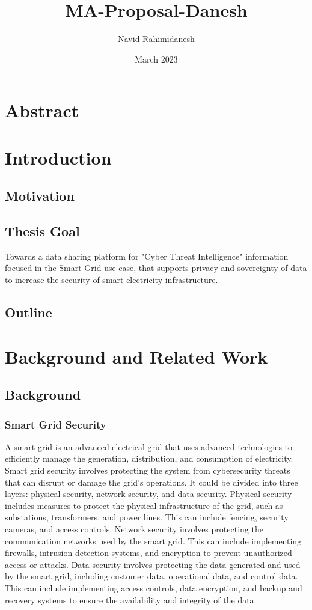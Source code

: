 \documentclass{article}
\title{MA-Proposal-Danesh}
\author{Navid Rahimidanesh}
\date{March 2023}
\begin{document}
\maketitle

\section{Abstract}

\section{Introduction} %

\subsection{Motivation}

\subsection{Thesis Goal}

Towards a data sharing platform for "Cyber Threat Intelligence" information focused in the Smart Grid use case, that supports privacy and sovereignty of data to increase the security of smart electricity infrastructure.

\subsection{Outline}


\section{Background and Related Work} %

\subsection{Background}
\subsubsection*{Smart Grid Security}
A smart grid is an advanced electrical grid that uses advanced technologies to efficiently manage the generation, distribution, and consumption of electricity. Smart grid security involves protecting the system from cybersecurity threats that can disrupt or damage the grid's operations. It could be divided into three layers: physical security, network security, and data security. Physical security includes measures to protect the physical infrastructure of the grid, such as substations, transformers, and power lines. This can include fencing, security cameras, and access controls. Network security involves protecting the communication networks used by the smart grid. This can include implementing firewalls, intrusion detection systems, and encryption to prevent unauthorized access or attacks. Data security involves protecting the data generated and used by the smart grid, including customer data, operational data, and control data. This can include implementing access controls, data encryption, and backup and recovery systems to ensure the availability and integrity of the data. 
\end{document}
